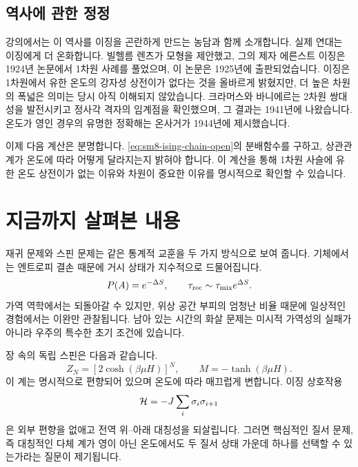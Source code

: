 \subsection{역사에 관한 정정}

강의에서는 이 역사를 이징을 곤란하게 만드는 농담과 함께 소개합니다. 실제 연대는 이징에게 더 온화합니다. 빌헬름 렌츠가 모형을 제안했고, 그의 제자 에른스트 이징은 1924년 논문에서 1차원 사례를 풀었으며, 이 논문은 1925년에 출판되었습니다. 이징은 1차원에서 유한 온도의 강자성 상전이가 없다는 것을 올바르게 밝혔지만, 더 높은 차원의 폭넓은 의미는 당시 아직 이해되지 않았습니다. 크라머스와 바니에르는 2차원 쌍대성을 발전시키고 정사각 격자의 임계점을 확인했으며, 그 결과는 1941년에 나왔습니다. 온도가 영인 경우의 유명한 정확해는 온사거가 1944년에 제시했습니다.

이제 다음 계산은 분명합니다. \eqref{eq:sm8-ising-chain-open}의 분배함수를 구하고, 상관관계가 온도에 따라 어떻게 달라지는지 밝혀야 합니다. 이 계산을 통해 1차원 사슬에 유한 온도 상전이가 없는 이유와 차원이 중요한 이유를 명시적으로 확인할 수 있습니다.

\section{지금까지 살펴본 내용}

재귀 문제와 스핀 문제는 같은 통계적 교훈을 두 가지 방식으로 보여 줍니다. 기체에서는 엔트로피 결손 때문에 거시 상태가 지수적으로 드물어집니다.
\begin{equation}
 P(A)=e^{-\Delta S},
 \qquad
 \tau_{\rm rec}\sim\tau_{\rm mix}e^{\Delta S}.
 \label{eq:sm8-summary-recurrence}
\end{equation}
가역 역학에서는 되돌아갈 수 있지만, 위상 공간 부피의 엄청난 비율 때문에 일상적인 경험에서는 이완만 관찰됩니다. 남아 있는 시간의 화살 문제는 미시적 가역성의 실패가 아니라 우주의 특수한 초기 조건에 있습니다.

장 속의 독립 스핀은 다음과 같습니다.
\begin{equation}
 Z_N=\left[2\cosh(\beta\mu H)\right]^N,
 \qquad
 M=-\tanh(\beta\mu H).
 \label{eq:sm8-summary-spins}
\end{equation}
이 계는 명시적으로 편향되어 있으며 온도에 따라 매끄럽게 변합니다. 이징 상호작용
\begin{equation}
 {\cal H}=-J\sum_i\sigma_i\sigma_{i+1}
 \label{eq:sm8-summary-ising}
\end{equation}
은 외부 편향을 없애고 전역 위--아래 대칭성을 되살립니다. 그러면 핵심적인 질서 문제, 즉 대칭적인 다체 계가 영이 아닌 온도에서도 두 질서 상태 가운데 하나를 선택할 수 있는가라는 질문이 제기됩니다.

